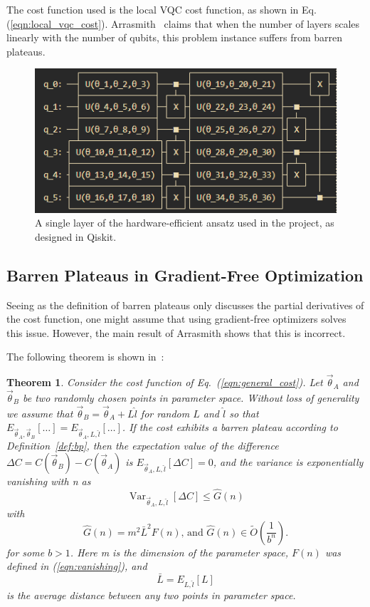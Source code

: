 \documentclass[a4paper,12pt]{article}
\newcommand{\thetas}{\vec{\theta}}
\DeclareMathOperator{\Var}{Var}
\newtheorem{theorem}{Theorem}
\begin{document}
The cost function used is the local VQC cost function, as shown in Eq. (\ref{eqn:local_vqc_cost}).
Arrasmith~\cite{arrasmith_effect_2021} claims that when the number of layers scales linearly with the number of qubits, this problem instance suffers from barren plateaus.

\begin{figure}[h]
    \centering
    \includegraphics{arrasmith_layer.png}
    \caption{A single layer of the hardware-efficient ansatz used in the project, as designed in Qiskit.}
    \label{fig:layer}
\end{figure}

\subsection{Barren Plateaus in Gradient-Free Optimization}
Seeing as the definition of barren plateaus only discusses the partial derivatives of the cost function, one might assume that using gradient-free optimizers solves this issue.
However, the main result of Arrasmith shows that this is incorrect.

The following theorem is shown in~\cite{arrasmith_effect_2021}:

\begin{theorem}
    Consider the cost function of Eq.~(\ref{eqn:general_cost}). Let ${\thetas}_A$ and $\thetas_B$ be two randomly chosen points in parameter space.
    Without loss of generality we assume that $\thetas_B = \thetas_A + L\hat{l}$ for random $L$ and $\hat{l}$ so that $E_{\thetas_A, \thetas_B}[\dots] = E_{\thetas_A, L, \hat{l}}[\dots]$.
    If the cost exhibits a barren plateau according to Definition~\ref{def:bp}, then the expectation value of the difference $\Delta C = C(\thetas_B) - C(\thetas_A)$ is $E_{\thetas_A, L, \hat{l}}[\Delta C] = 0$, and the variance is exponentially vanishing with n as 
    \begin{equation}
        \Var_{\thetas_A,L,\hat{l}}[\Delta C] \leq \hat{G}(n)
    \end{equation}
    with
    \begin{equation}
        \hat{G}(n) = m^2 \bar{L}^2 F(n)\textrm{,    and     } \hat{G}(n) \in \tilde{O}\left(\frac{1}{b^n}\right).
    \end{equation}
    for some $b>1$. Here m is the dimension of the parameter space, $F(n)$ was defined in (\ref{eqn:vanishing}), and
    \begin{equation}
        \bar{L} = E_{L,\hat{l}}[L]
    \end{equation}
    is the average distance between any two points in parameter space.
\end{theorem}
\end{document}

